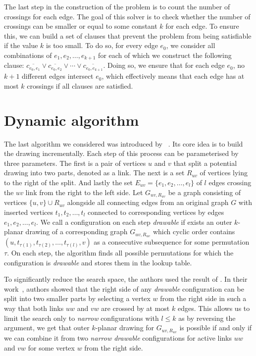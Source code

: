 The last step in the construction of the problem is to count the number of crossings for each edge.
The goal of this solver is to check whether the number of crossings can be smaller or equal to some constant $k$ for each edge.
To ensure this, we can build a set of clauses that prevent the problem from being satisfiable if the value $k$ is too small.
To do so, for every edge $e_0$, we consider all combinations of $e_1, e_2, \dots, e_{k+1}$ for each of which we construct the following clause: $\overline{c_{e_0, e_1}} \lor \overline{c_{e_0, e_2}} \lor \cdots\lor \overline{c_{e_0, e_{k+1}}}$.
Doing so, we ensure that for each edge $e_0$, no $k + 1$ different edges intersect $e_0$, which effectively means that each edge has at most $k$ crossings if all clauses are satisfied.



\section{Dynamic algorithm}

The last algorithm we considered was introduced by \citeauthor{okp}~\cite{okp}. Its core idea is to build the drawing incrementally. Each step of this process can be parameterised by three parameters. The first is a pair of vertices \(u\) and \(v\) that split a potential drawing into two parts, denoted as a link. The next is a set \(R_{uv}\) of vertices lying to the right of the split. And lastly the set \(E_{uv} = \{e_1, e_2, \dots, e_l\}\) of \(l\) edges crossing the \(uv\) link from the right to the left side. Let \(G_{uv, R_{uv}}\) be a graph consisting of vertices \(\{u, v\} \cup R_{uv}\) alongside all connecting edges from an original graph \(G\) with inserted vertices \(t_1, t_2, \dots, t_l\) connected to corresponding vertices by edges \(e_1, e_2, \dots, e_l\). We call a configuration on each step \emph{drawable} if exists an outer \(k\)-planar drawing of a corresponding graph \(G_{uv, R_{uv}}\) which cyclic order contains \((u, t_{\tau(1)}, t_{\tau(2)}, \dots, t_{\tau(l)}, v)\) as a consecutive subsequence for some permutation \(\tau\). On each step, the algorithm finds all possible permutations for which the configuration is \emph{drawable} and stores them in the lookup table.

To significantly reduce the search space, the authors used the result of \citeauthor{triangulations}. In their work~\cite{triangulations}, authors showed that the right side of any \emph{drawable} configuration can be split into two smaller parts by selecting a vertex \(w\) from the right side in such a way that both links \(uw\) and \(vw\) are crossed by at most \(k\) edges. This allows us to limit the search only to \emph{narrow} configurations with \(l \leqslant k\) as by reversing the argument, we get that outer \(k\)-planar drawing for \(G_{uv, R_{uv}}\) is possible if and only if we can combine it from two \emph{narrow drawable} configurations for active links \(uw\) and \(vw\) for some vertex \(w\) from the right side.


